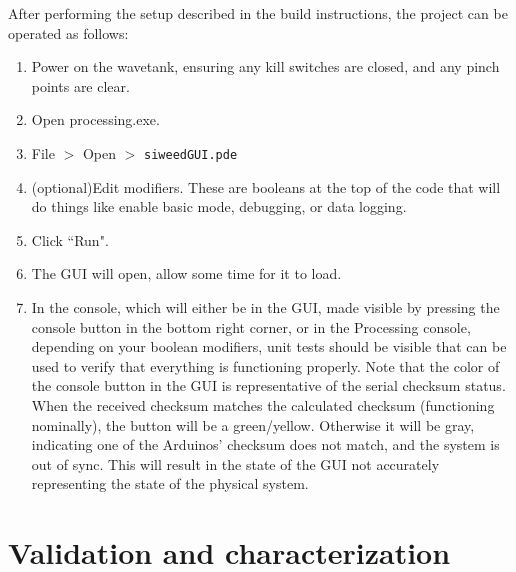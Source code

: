 \documentclass[hardware,article,submit,pdftex,moreauthors]{Definitions/mdpi}
\begin{document}
After performing the setup described in the build instructions, the project can be operated as follows:
\begin{enumerate}
\item Power on the wavetank, ensuring any kill switches are closed, and any pinch points are clear.
\item Open processing.exe.
\item File $>$ Open $>$ \texttt{siweedGUI.pde} 
\item (optional)Edit modifiers. These are booleans at the top of the code that will do things like enable basic mode, debugging, or data logging.
\item Click ``Run".
\item The GUI will open, allow some time for it to load.
\item In the console, which will either be in the GUI, made visible by pressing the console button in the bottom right corner, or in the Processing console, depending on your boolean modifiers, unit tests should be visible that can be used to verify that everything is functioning properly. 
Note that the color of the console button in the GUI is representative of the serial checksum status.
When the received checksum matches the calculated checksum (functioning nominally), the button will be a green/yellow.
Otherwise it will be gray, indicating one of the Arduinos' checksum does not match, and the system is out of sync. 
This will result in the state of the GUI not accurately representing the state of the physical system.
\end{enumerate}

\section{Validation and characterization}
\end{document}
